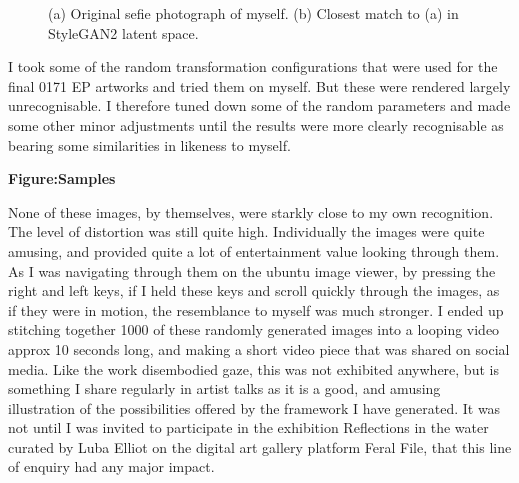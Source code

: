 \begin{figure}[!htbp]
    \hfill
    \hfill
    \caption{(a) Original sefie photograph of myself. (b) Closest match to (a) in StyleGAN2 latent space.}
    \label{fig:c7:selfie}
 \end{figure}

I took some of the random transformation configurations that were used for the final 0171 EP artworks and tried them on myself. But these were rendered largely unrecognisable. 
I therefore tuned down some of the random parameters and made some other minor adjustments until the results were more clearly recognisable as bearing some similarities in likeness to myself.

\textbf{Figure:Samples}

None of these images, by themselves, were starkly close to my own recognition. 
The level of distortion was still quite high.
Individually the images were quite amusing, and provided quite a lot of entertainment value looking through them. 
As I was navigating through them on the ubuntu image viewer, by pressing the right and left keys, if I held these keys and scroll quickly through the images, as if they were in motion, the resemblance to myself was much stronger. I ended up stitching together 1000 of these randomly generated images into a looping video approx 10 seconds long, and making a short video piece that was shared on social media. 
Like the work disembodied gaze, this was not exhibited anywhere, but is something I share regularly in artist talks as it is a good, and amusing illustration of the possibilities offered by the framework I have generated. 
It was not until I was invited to participate in the exhibition Reflections in the water curated by Luba Elliot on the digital art gallery platform Feral File, that this line of enquiry had any major impact. 

